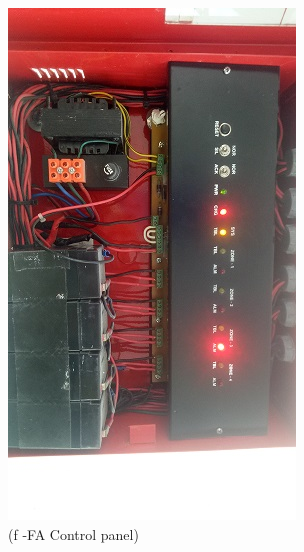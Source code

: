 \begin{figure}
\begin{minipage}[b]{0.25\linewidth}
	\includegraphics[width=\textwidth]{figures/R1P_fdas/fdasfunction.jpg}
	\caption*{(f -FA Control panel)}
\end{minipage}
	\hspace{0.05cm}
\begin{minipage}[b]{0.25\linewidth}
	\centering

\end{minipage}
\end{figure}
